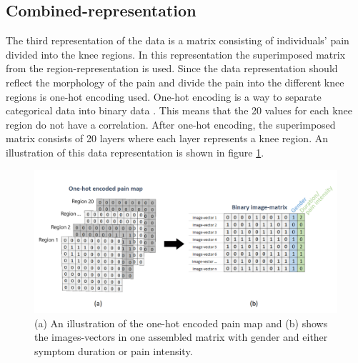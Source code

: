 \subsection{Combined-representation} \label{sec:combined}
The third representation of the data is a matrix consisting of individuals’ pain divided into the knee regions.
\noindent
In this representation the superimposed matrix from the region-representation is used. Since the data representation should reflect the morphology of the pain and divide the pain into the different knee regions is one-hot encoding used. One-hot encoding is a way to separate categorical data into binary data \citep{Harris2012}. This means that the 20 values for each knee region do not have a correlation. After one-hot encoding, the superimposed matrix consists of 20 layers where each layer represents a knee region. An illustration of this data representation is shown in figure \ref{fig:onehot}.


\begin{figure} [H]
\centering
\includegraphics[width=1\textwidth]{figures/onehotmatrix}
\caption{(a) An illustration of the one-hot encoded pain map and (b) shows the images-vectors in one assembled matrix with gender and either symptom duration or pain intensity.}
\label{fig:onehot}
\end{figure}
